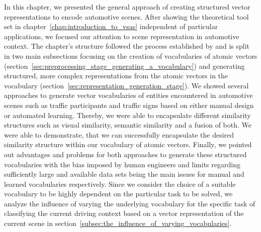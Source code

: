 In this chapter, we presented the general approach of creating structured vector representations to encode automotive scenes.
After showing the theoretical tool set in chapter~\ref{chap:introduction_to_vsas} independent of particular applications, we focused our attention to scene representation in automotive context.
The chapter's structure followed the process established by \textcite{Gallant2013} and is split in two main subsections focusing on the creation of vocabularies of atomic vectors (section~\ref{sec:preprocessing_stage_generating_a_vocabulary}) and generating structured, more complex representations from the atomic vectors in the vocabulary (section~\ref{sec:representation_generation_stage}).
We showed several approaches to generate vector vocabularies of entities encountered in automotive scenes such as traffic participants and traffic signs based on either manual design or automated learning.
Thereby, we were able to encapsulate different similarity structures such as visual similarity, semantic similarity and a fusion of both.
We were able to demonstrate, that we can successfully encapsulate the desired similarity structure within our vocabulary of atomic vectors.
Finally, we pointed out advantages and problems for both approaches to generate these structured vocabularies with the bias imposed by human engineers and limits regarding sufficiently large and available data sets being the main issues for manual and learned vocabularies respectively.
Since we consider the choice of a suitable vocabulary to be highly dependent on the particular task to be solved, we analyze the influence of varying the underlying vocabulary for the specific task of classifying the current driving context based on a vector representation of the current scene in section~\ref{subsec:the_influence_of_varying_vocabularies}.

